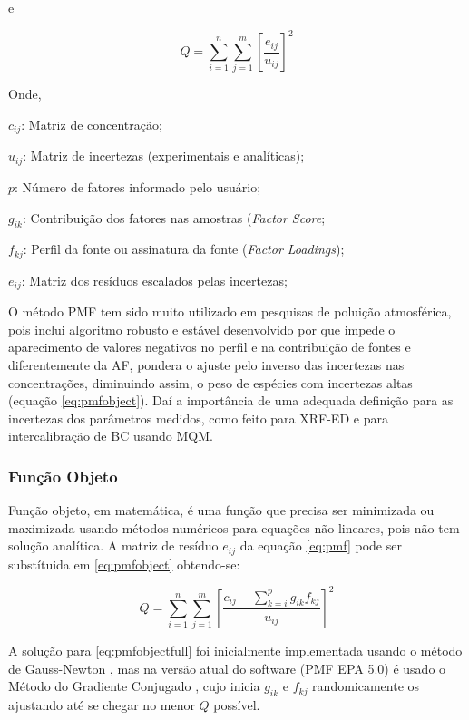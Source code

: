 e

\begin{equation}
  Q = \sum_{i=1}^n \sum_{j=1}^m  \left[ \frac{e_{ij}} {u_{ij}} \right] ^2
  \label{eq:pmfobject}
\end{equation}

Onde,
\begin{itemize}
  \begin{spacing}{1.0}
	\item $c_{ij}$: Matriz de concentração;
	\item $u_{ij}$: Matriz de incertezas (experimentais e analíticas);
	\item $p$: Número de fatores informado pelo usuário;
	\item $g_{ik}$: Contribuição dos fatores nas amostras (\textit{Factor Score};
	\item $f_{kj}$: Perfil da fonte ou assinatura da fonte (\textit{Factor Loadings});
	\item $e_{ij}$: Matriz dos resíduos escalados pelas incertezas;
  \end{spacing}
\end{itemize}

O método PMF tem sido muito utilizado em pesquisas de poluição 
atmosférica, pois inclui algoritmo robusto e estável desenvolvido por 
\citet{paatero1994} que impede o aparecimento de valores negativos no 
perfil e na contribuição de fontes e diferentemente da AF, pondera o ajuste 
pelo inverso das incertezas nas concentrações, diminuindo assim, o peso de 
espécies com incertezas altas (equação \ref{eq:pmfobject}).
Daí a importância de uma adequada definição para as incertezas dos parâmetros 
medidos, como feito para XRF-ED e para intercalibração de BC usando MQM.

\subsubsection{Função Objeto}

Função objeto, em matemática, é uma função que precisa ser minimizada 
ou maximizada usando métodos numéricos para equações não lineares, pois não 
tem solução analítica. A matriz de resíduo ${e_{ij}}$ da equação \ref{eq:pmf}
pode ser substítuida em \ref{eq:pmfobject} obtendo-se:

\begin{equation}
  Q = \sum_{i=1}^n \sum_{j=1}^m  \left[ \frac{c_{ij} - \sum_{k=i}^p g_{ik}f_{kj}} {u_{ij}} \right] ^2
  \label{eq:pmfobjectfull}
\end{equation}

A solução para \ref{eq:pmfobjectfull} foi inicialmente implementada usando 
o método de Gauss-Newton \citep{paatero1994}, mas na versão atual do software 
(PMF EPA 5.0) é usado o Método do Gradiente Conjugado \citep{norris2014}, 
cujo inicia $g_{ik}$ e $f_{kj}$ randomicamente os ajustando até se chegar no 
menor $Q$ possível.

